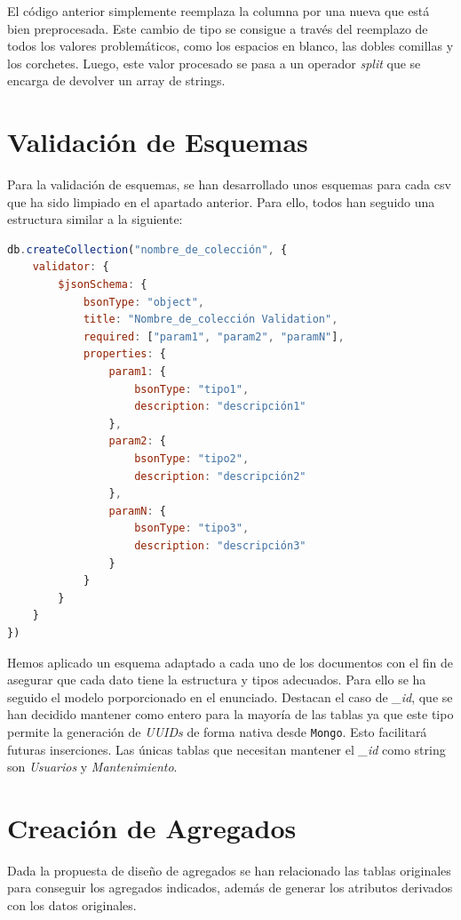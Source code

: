\documentclass[]{article}
\begin{document}
El código anterior simplemente reemplaza la columna por una nueva que está bien preprocesada. Este cambio de tipo se consigue a través del reemplazo de todos los valores problemáticos, como los espacios en blanco, las dobles comillas y los corchetes. Luego, este valor procesado se pasa a un operador \textit{split} que se encarga de devolver un array de strings.
\newpage
\section{Validación de Esquemas}
\label{sec:validacion}
Para la validación de esquemas, se han desarrollado unos esquemas para cada csv que ha sido limpiado en el apartado anterior. Para ello, todos han seguido una estructura similar a la siguiente:

\begin{lstlisting}[language=JavaScript, caption=Estructura genérica de la validación de esquemas]
db.createCollection("nombre_de_colección", {
    validator: {
        $jsonSchema: {
            bsonType: "object",
            title: "Nombre_de_colección Validation",
            required: ["param1", "param2", "paramN"],
            properties: {
                param1: {
                    bsonType: "tipo1",
                    description: "descripción1"
                },
                param2: {
                    bsonType: "tipo2",
                    description: "descripción2"
                },
                paramN: {
                    bsonType: "tipo3",
                    description: "descripción3"
                }
            }
        }
    }
})
\end{lstlisting}

Hemos aplicado un esquema adaptado a cada uno de los documentos con el fin de asegurar que cada dato tiene la estructura y tipos adecuados. Para ello se ha seguido el modelo porporcionado en el enunciado. Destacan el caso de \textit{\_id}, que se han decidido mantener como entero para la mayoría de las tablas ya que este tipo permite la generación de \textit{UUIDs} de forma nativa desde \texttt{Mongo}. Esto facilitará futuras inserciones. Las únicas tablas que necesitan mantener el \textit{\_id} como string son \textit{Usuarios} y \textit{Mantenimiento}. 


\newpage
\section{Creación de Agregados}
\label{sec:creacion_agregados}
Dada la propuesta de diseño de agregados se han relacionado las tablas originales para conseguir los agregados indicados, además de generar los atributos derivados con los datos originales.
\end{document}
